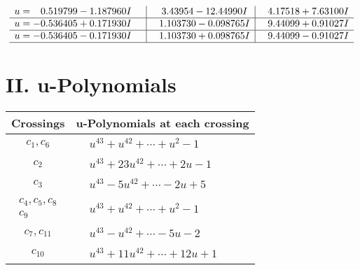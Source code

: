 \documentclass[1p]{elsarticle_modified}
\theoremstyle{definition}
\begin{document}
$$\begin{array}{c|c|c}
\begin{aligned}
u &= \phantom{-}0.519799 - 1.187960 I\end{aligned}
 & \phantom{-}3.43954 - 12.44990 I & \phantom{-}4.17518 + 7.63100 I \\ \hline\begin{aligned}
u &= -0.536405 + 0.171930 I\end{aligned}
 & \phantom{-}1.103730 - 0.098765 I & \phantom{-}9.44099 + 0.91027 I \\ \hline\begin{aligned}
u &= -0.536405 - 0.171930 I\end{aligned}
 & \phantom{-}1.103730 + 0.098765 I & \phantom{-}9.44099 - 0.91027 I\\
 \hline 
 \end{array}$$\newpage
\newpage\renewcommand{\arraystretch}{1}
\centering \section*{ II. u-Polynomials}
\begin{tabular}{m{50pt}|m{274pt}}
Crossings & \hspace{64pt}u-Polynomials at each crossing \\
\hline $$\begin{aligned}c_{1},c_{6}\end{aligned}$$&$\begin{aligned}
&u^{43}+u^{42}+\cdots+u^2-1
\end{aligned}$\\
\hline $$\begin{aligned}c_{2}\end{aligned}$$&$\begin{aligned}
&u^{43}+23 u^{42}+\cdots+2 u-1
\end{aligned}$\\
\hline $$\begin{aligned}c_{3}\end{aligned}$$&$\begin{aligned}
&u^{43}-5 u^{42}+\cdots-2 u+5
\end{aligned}$\\
\hline $$\begin{aligned}c_{4},c_{5},c_{8}\\c_{9}\end{aligned}$$&$\begin{aligned}
&u^{43}+u^{42}+\cdots+u^2-1
\end{aligned}$\\
\hline $$\begin{aligned}c_{7},c_{11}\end{aligned}$$&$\begin{aligned}
&u^{43}- u^{42}+\cdots-5 u-2
\end{aligned}$\\
\hline $$\begin{aligned}c_{10}\end{aligned}$$&$\begin{aligned}
&u^{43}+11 u^{42}+\cdots+12 u+1
\end{aligned}$\\
\hline
\end{tabular}\newpage\renewcommand{\arraystretch}{1}
\end{document}
